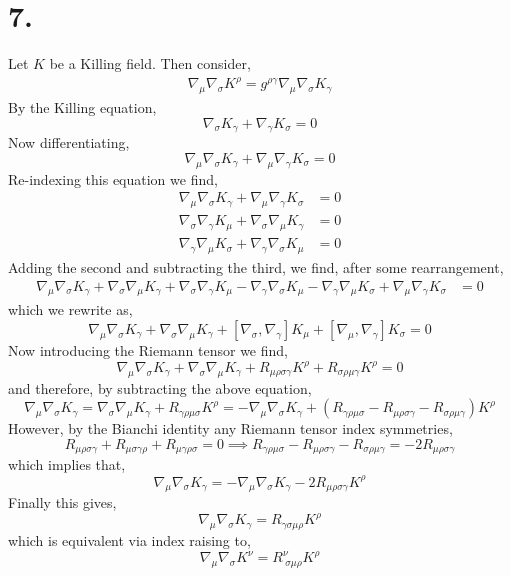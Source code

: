 \documentclass[12pt]{article}
\begin{document}
\section*{7.}

Let $K$ be a Killing field. Then consider,
\begin{align*}
\nabla_\mu \nabla_\sigma K^\rho = g^{\rho \gamma} \nabla_\mu \nabla_\sigma K_\gamma 
\end{align*}
By the Killing equation,
\[ \nabla_\sigma K_\gamma + \nabla_\gamma K_\sigma = 0 \]
Now differentiating,
\[ \nabla_\mu \nabla_\sigma K_\gamma + \nabla_\mu \nabla_\gamma K_\sigma = 0 \]
Re-indexing this equation we find,
\begin{align*}
\nabla_\mu \nabla_\sigma K_\gamma + \nabla_\mu \nabla_\gamma K_\sigma & = 0
\\
\nabla_\sigma \nabla_\gamma K_\mu + \nabla_\sigma \nabla_\mu K_\gamma & = 0
\\
\nabla_\gamma \nabla_\mu K_\sigma + \nabla_\gamma \nabla_\sigma K_\mu & = 0
\end{align*} 
Adding the second and subtracting the third, we find, after some rearrangement,
\begin{align*}
\nabla_\mu \nabla_\sigma K_\gamma + \nabla_\sigma \nabla_\mu K_\gamma + \nabla_\sigma \nabla_\gamma K_\mu - \nabla_\gamma \nabla_\sigma K_\mu - \nabla_\gamma \nabla_\mu K_\sigma + \nabla_\mu \nabla_\gamma K_\sigma & = 0
\end{align*}
which we rewrite as,
\[ \nabla_\mu \nabla_\sigma K_\gamma + \nabla_\sigma \nabla_\mu K_\gamma + [ \nabla_\sigma, \nabla_\gamma] K_\mu + [\nabla_\mu, \nabla_\gamma] K_\sigma = 0 \]
Now introducing the Riemann tensor we find,
\[ 
\nabla_\mu \nabla_\sigma K_\gamma + \nabla_\sigma \nabla_\mu K_\gamma +  R_{\mu \rho \sigma \gamma} K^\rho + R_{\sigma \rho \mu \gamma} K^\rho  = 0 \]
and therefore, by subtracting the above equation,
\[ \nabla_\mu \nabla_\sigma K_\gamma = \nabla_\sigma \nabla_\mu K_\gamma + R_{\gamma \rho \mu \sigma} K^\rho = - \nabla_\mu \nabla_\sigma K_\gamma + (R_{\gamma \rho \mu \sigma} - R_{\mu \rho \sigma \gamma} - R_{\sigma \rho \mu \gamma} ) K^\rho \]
However, by the Bianchi identity any Riemann tensor index symmetries,
\[ R_{\mu \rho \sigma \gamma} + R_{\mu \sigma \gamma \rho} + R_{\mu \gamma \rho \sigma} = 0 \implies R_{\gamma \rho \mu \sigma} - R_{\mu \rho \sigma \gamma} - R_{\sigma \rho \mu \gamma} = - 2 R_{\mu \rho \sigma \gamma} \]
which implies that,
\[ \nabla_\mu \nabla_\sigma K_\gamma = - \nabla_\mu \nabla_\sigma K_\gamma - 2 R_{\mu \rho \sigma \gamma} K^\rho \]
Finally this gives,
\[ \nabla_\mu \nabla_\sigma K_\gamma = R_{\gamma \sigma \mu \rho} K^\rho \]
which is equivalent via index raising to,
\[ \nabla_\mu \nabla_\sigma K^\nu = R^\nu_{\: \sigma \mu \rho} K^\rho \]
\end{document}
